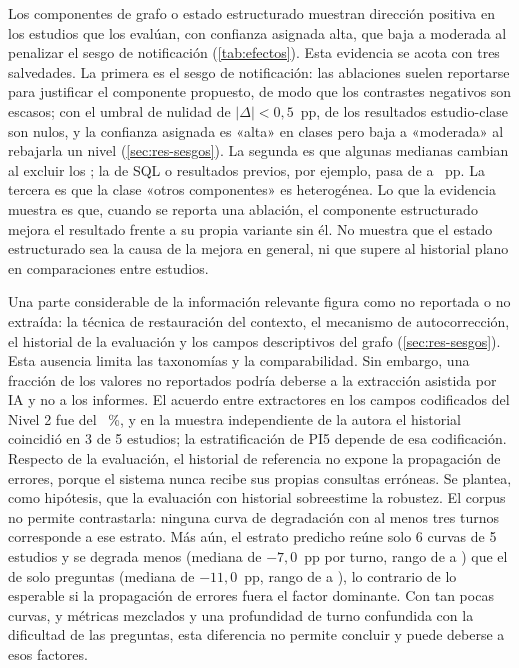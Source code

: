 Los componentes de grafo o estado estructurado muestran dirección positiva en los \efGrafoN{} estudios que los evalúan, con confianza asignada alta, que baja a moderada al penalizar el sesgo de notificación (\cref{tab:efectos}). Esta evidencia se acota con tres salvedades. La primera es el sesgo de notificación: las ablaciones suelen reportarse para justificar el componente propuesto, de modo que los contrastes negativos son escasos; con el umbral de nulidad de $|\Delta| < 0{,}5$~pp, \nulosUmbral{} de los \nEstClase{} resultados estudio-clase son nulos, y la confianza asignada es «alta» en \nConfAlta{} clases pero baja a «moderada» al rebajarla un nivel (\cref{sec:res-sesgos}). La segunda es que algunas medianas cambian al excluir los ; la de SQL o resultados previos, por ejemplo, pasa de \efSQLPrevMed{} a \efSQLPrevMedSinPre{}~pp. La tercera es que la clase «otros componentes» es heterogénea. Lo que la evidencia muestra es que, cuando se reporta una ablación, el componente estructurado mejora el resultado frente a su propia variante sin él. No muestra que el estado estructurado sea la causa de la mejora en general, ni que supere al historial plano en comparaciones entre estudios.

Una parte considerable de la información relevante figura como no reportada o no extraída: la técnica de restauración del contexto, el mecanismo de autocorrección, el historial de la evaluación y los campos descriptivos del grafo (\cref{sec:res-sesgos}). Esta ausencia limita las taxonomías y la comparabilidad. Sin embargo, una fracción de los valores no reportados podría deberse a la extracción asistida por IA y no a los informes. El acuerdo entre extractores en los campos codificados del Nivel 2 fue del \acuerdoNivelDos~\%, y en la muestra independiente de la autora el historial coincidió en 3 de 5 estudios; la estratificación de PI5 depende de esa codificación. Respecto de la evaluación, el historial de referencia no expone la propagación de errores, porque el sistema nunca recibe sus propias consultas erróneas. Se plantea, como hipótesis, que la evaluación con historial  sobreestime la robustez. El corpus no permite contrastarla: ninguna curva de degradación con al menos tres turnos corresponde a ese estrato. Más aún, el estrato predicho reúne solo 6 curvas de 5 estudios y se degrada menos (mediana de $-7{,}0$~pp por turno, rango de \degPredMin{} a \degPredMax{}) que el de solo preguntas (mediana de $-11{,}0$~pp, rango de \degSoloMin{} a \degSoloMax{}), lo contrario de lo esperable si la propagación de errores fuera el factor dominante. Con tan pocas curvas,  y métricas mezclados y una profundidad de turno confundida con la dificultad de las preguntas, esta diferencia no permite concluir y puede deberse a esos factores.


